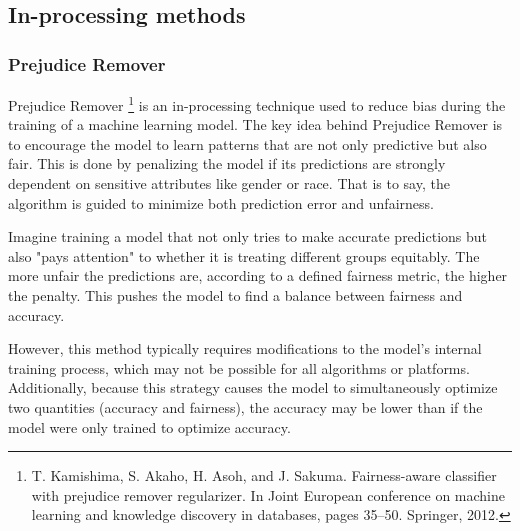 \begin{VCSet}
    \begin{visualComponent}
    \end{visualComponent}
    
    \begin{visualComponent}
    \end{visualComponent}
    
    \begin{visualComponent}
    \end{visualComponent}
\end{VCSet}


\subsection{In-processing methods}
\subsubsection{Prejudice Remover}
\par Prejudice Remover \footnote{T. Kamishima, S. Akaho, H. Asoh, and J. Sakuma. Fairness-aware classifier with prejudice remover regularizer. In Joint European conference on machine learning and knowledge discovery in databases, pages 35–50. Springer, 2012.} is an in-processing technique used to reduce bias during the training of a machine learning model.  The key idea behind Prejudice Remover is to encourage the model to learn patterns that are not only predictive but also fair. This is done by penalizing the model if its predictions are strongly dependent on sensitive attributes like gender or race. That is to say, the algorithm is guided to minimize both prediction error and unfairness.
\par Imagine training a model that not only tries to make accurate predictions but also "pays attention" to whether it is treating different groups equitably. The more unfair the predictions are, according to a defined fairness metric, the higher the penalty. This pushes the model to find a balance between fairness and accuracy. 
\par However, this method typically requires modifications to the model’s internal training process, which may not be possible for all algorithms or platforms. Additionally, because this strategy causes the model to simultaneously optimize two quantities (accuracy and fairness), the accuracy may be lower than if the model were only trained to optimize accuracy.

